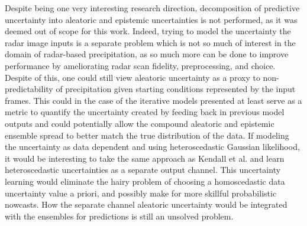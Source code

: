 Despite being one very interesting research direction, decomposition of predictive uncertainty into aleatoric and epistemic uncertainties is not performed, as it was deemed out of scope for this work. Indeed, trying to model the uncertainty the radar image inputs is a separate problem which is not so much of interest in the domain of radar-based precipitation, as so much more can be done to improve performance by ameliorating radar scan fidelity, preprocessing, and choice. Despite of this, one could still view aleatoric uncertainty as a proxy to non-predictability of precipitation given starting conditions represented by the input frames. This could in the case of the iterative models presented at least serve as a metric to quantify the uncertainty created by feeding back in previous model outputs and could potentially allow the compound aleatoric and epistemic ensemble spread to better match the true distribution of the data. If modeling the uncertainty as data dependent and using heteroscedastic Gaussian likelihood, it would be interesting to take the same approach as Kendall et al. \cite{kendall_what_2017} and learn heteroscedastic uncertainties as a separate output channel. This uncertainty learning would eliminate the hairy problem of choosing a homoscedastic data uncertainty value a priori, and possibly make for more skillful probabilistic nowcasts. How the separate channel aleatoric uncertainty would be integrated with the ensembles for predictions is still an unsolved problem. 

